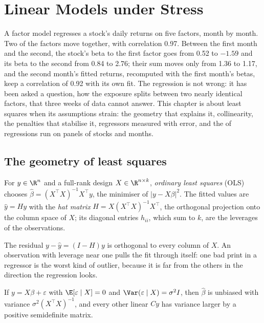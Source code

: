 \chapter{Linear Models under Stress}\label{ch:qm:linear-models-under-stress}

A factor model regresses a stock's daily returns on five factors, month by month. Two of the factors move together, with
correlation 0.97. Between the first month and the second, the stock's beta to the first factor goes from 0.52 to $-1.59$ and its
beta to the second from 0.84 to 2.76; their sum moves only from 1.36 to 1.17, and the second month's fitted returns, recomputed
with the first month's betas, keep a correlation of 0.92 with its own fit. The regression is not wrong: it has been asked a
question, how the exposure splits between two nearly identical factors, that three weeks of data cannot answer. This chapter is
about least squares when its assumptions strain: the geometry that explains it, collinearity, the penalties that stabilise it,
regressors measured with error, and the  of regressions run on panels of stocks and months.

\section{The geometry of least squares}

\begin{definition}\label{def:qm:linear-models-under-stress:ols}
For $y \in \R^n$ and a full-rank design $X \in \R^{n \times k}$, \emph{ordinary least squares} (OLS) chooses
$\hat\beta = (X^\top X)^{-1}X^\top y$, the minimiser of $\lvert y - X\beta\rvert^2$. The fitted values are $\hat y = Hy$ with the \emph{hat
matrix} $H = X(X^\top X)^{-1}X^\top$, the orthogonal projection onto the column space of $X$; its diagonal entries
$h_{ii}$, which sum to $k$, are the leverages of the observations.
\end{definition}

The residual $y - \hat y = (I - H)y$ is orthogonal to every column of $X$. An observation with leverage near one pulls the fit
through itself: one bad print in a regressor is the worst kind of outlier, because it is far from the others in the direction the
regression looks.

\begin{theorem}\label{thm:qm:linear-models-under-stress:gm}
If $y = X\beta + \varepsilon$ with $\E[\varepsilon \mid X] = 0$ and $\Var(\varepsilon \mid X) = \sigma^2I$, then $\hat\beta$ is unbiased with
variance $\sigma^2(X^\top X)^{-1}$, and every other linear  $Cy$ has variance larger by a positive semidefinite matrix.
\end{theorem}


